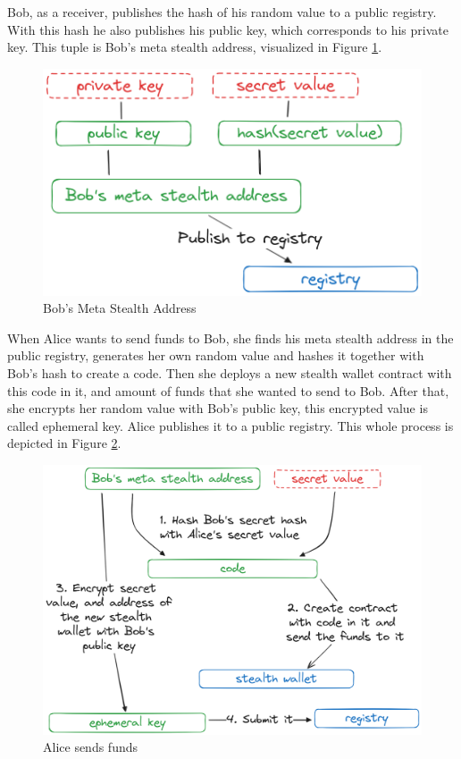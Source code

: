 \documentclass[conference,comsoc,10pt]{IEEEtran}
\begin{document}
    Bob, as a receiver, publishes the hash of his random value to a public
    registry. With this hash he also publishes his public key, which corresponds
    to his private key. This tuple is Bob's meta stealth address, visualized in Figure
    \ref{fig:bobs-meta-address}.

    \begin{figure}[h]
        \centering
        \includegraphics[scale=0.20]{./assets/images/meta-stealth-address.png}
        \caption{Bob's Meta Stealth Address}
        \label{fig:bobs-meta-address}
    \end{figure}

    When Alice wants to send funds to Bob, she finds his meta stealth address
    in the public registry, generates her own random value and hashes it together
    with Bob's hash to create a code. Then she deploys a new stealth wallet
    contract with this code in it, and amount of funds that she wanted to send
    to Bob. After that, she encrypts her random value with Bob's public key,
    this encrypted value is called ephemeral key. Alice publishes it to a
    public registry. This whole process is depicted in Figure \ref{fig:sending-funds}. 

    \begin{figure}[h]
        \centering
        \includegraphics[scale=0.17]{./assets/images/sending-funds.png}
        \caption{Alice sends funds}
        \label{fig:sending-funds}
    \end{figure}
\end{document}
